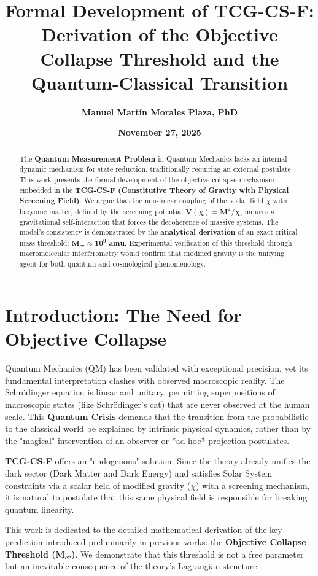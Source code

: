 \documentclass[11pt, a4paper]{article}
\title{\textbf{Formal Development of TCG-CS-F: Derivation of the Objective Collapse Threshold and the Quantum-Classical Transition}}
\author{\textbf{Manuel Martín Morales Plaza, PhD}}
\affil{Independent Researcher, Canary Islands, Spain \\ \textit{Email: manuelmartin@doctor.com}}
\date{\textbf{November 27, 2025}}
\begin{document}
\maketitle

\begin{abstract}
The \textbf{Quantum Measurement Problem} in Quantum Mechanics lacks an internal dynamic mechanism for state reduction, traditionally requiring an external postulate. This work presents the formal development of the objective collapse mechanism embedded in the \textbf{TCG-CS-F (Constitutive Theory of Gravity with Physical Screening Field)}. We argue that the non-linear coupling of the scalar field $\chi$ with baryonic matter, defined by the screening potential $\mathbf{V(\chi) = M^4/\chi}$, induces a gravitational self-interaction that forces the decoherence of massive systems. The model's consistency is demonstrated by the \textbf{analytical derivation} of an exact critical mass threshold: $\mathbf{M_{cr} \approx 10^9 \text{ amu}}$. Experimental verification of this threshold through macromolecular interferometry would confirm that modified gravity is the unifying agent for both quantum and cosmological phenomenology.
\end{abstract}

\section{Introduction: The Need for Objective Collapse}

Quantum Mechanics (QM) has been validated with exceptional precision, yet its fundamental interpretation clashes with observed macroscopic reality. The Schrödinger equation is linear and unitary, permitting superpositions of macroscopic states (like Schrödinger's cat) that are never observed at the human scale. This \textbf{Quantum Crisis} demands that the transition from the probabilistic to the classical world be explained by intrinsic physical dynamics, rather than by the "magical" intervention of an observer or *ad hoc* projection postulates.

\textbf{TCG-CS-F} offers an "endogenous" solution. Since the theory already unifies the dark sector (Dark Matter and Dark Energy) and satisfies Solar System constraints via a scalar field of modified gravity ($\chi$) with a screening mechanism, it is natural to postulate that this same physical field is responsible for breaking quantum linearity.

This work is dedicated to the detailed mathematical derivation of the key prediction introduced preliminarily in previous works: the \textbf{Objective Collapse Threshold ($\mathbf{M_{cr}}$)}. We demonstrate that this threshold is not a free parameter but an inevitable consequence of the theory's Lagrangian structure.
\end{document}
